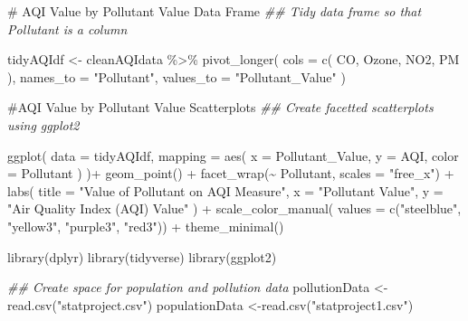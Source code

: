 \documentclass[
  letterpaper,
  DIV=11,
  numbers=noendperiod]{scrartcl}
\newenvironment{Shaded}{\begin{snugshade}}{\end{snugshade}}
\newcommand{\AttributeTok}[1]{\textcolor[rgb]{0.40,0.45,0.13}{#1}}
\newcommand{\CommentTok}[1]{\textcolor[rgb]{0.37,0.37,0.37}{#1}}
\newcommand{\DocumentationTok}[1]{\textcolor[rgb]{0.37,0.37,0.37}{\textit{#1}}}
\newcommand{\FunctionTok}[1]{\textcolor[rgb]{0.28,0.35,0.67}{#1}}
\newcommand{\NormalTok}[1]{\textcolor[rgb]{0.00,0.23,0.31}{#1}}
\newcommand{\OtherTok}[1]{\textcolor[rgb]{0.00,0.23,0.31}{#1}}
\newcommand{\SpecialCharTok}[1]{\textcolor[rgb]{0.37,0.37,0.37}{#1}}
\newcommand{\StringTok}[1]{\textcolor[rgb]{0.13,0.47,0.30}{#1}}
\begin{document}
\begin{Shaded}
\begin{Highlighting}[]
\CommentTok{\# AQI Value by Pollutant Value Data Frame}
\DocumentationTok{\#\# Tidy data frame so that Pollutant is a column}
  
\NormalTok{tidyAQIdf }\OtherTok{\textless{}{-}}\NormalTok{ cleanAQIdata }\SpecialCharTok{\%\textgreater{}\%}
  \FunctionTok{pivot\_longer}\NormalTok{(}
    \AttributeTok{cols =} \FunctionTok{c}\NormalTok{(}
\NormalTok{      CO,}
\NormalTok{      Ozone,}
\NormalTok{      NO2,}
\NormalTok{      PM}
\NormalTok{    ),}
    \AttributeTok{names\_to =} \StringTok{"Pollutant"}\NormalTok{,}
    \AttributeTok{values\_to =} \StringTok{"Pollutant\_Value"}
\NormalTok{  )}

\CommentTok{\#AQI Value by Pollutant Value Scatterplots}
\DocumentationTok{\#\# Create facetted scatterplots using ggplot2}

\FunctionTok{ggplot}\NormalTok{(}
  \AttributeTok{data =}\NormalTok{ tidyAQIdf,}
  \AttributeTok{mapping =} \FunctionTok{aes}\NormalTok{(}
    \AttributeTok{x =}\NormalTok{ Pollutant\_Value,}
    \AttributeTok{y =}\NormalTok{ AQI,}
    \AttributeTok{color =}\NormalTok{ Pollutant}
\NormalTok{    )}
\NormalTok{  )}\SpecialCharTok{+}
    \FunctionTok{geom\_point}\NormalTok{() }\SpecialCharTok{+}
    \FunctionTok{facet\_wrap}\NormalTok{(}\SpecialCharTok{\textasciitilde{}}\NormalTok{ Pollutant, }\AttributeTok{scales =} \StringTok{"free\_x"}\NormalTok{) }\SpecialCharTok{+}
    \FunctionTok{labs}\NormalTok{(}
      \AttributeTok{title =} \StringTok{"Value of Pollutant on AQI Measure"}\NormalTok{,}
      \AttributeTok{x =} \StringTok{"Pollutant Value"}\NormalTok{,}
      \AttributeTok{y =} \StringTok{"Air Quality Index (AQI) Value"}
\NormalTok{    ) }\SpecialCharTok{+}
    \FunctionTok{scale\_color\_manual}\NormalTok{(}
      \AttributeTok{values =} \FunctionTok{c}\NormalTok{(}\StringTok{"steelblue"}\NormalTok{, }\StringTok{"yellow3"}\NormalTok{, }\StringTok{"purple3"}\NormalTok{, }\StringTok{"red3"}\NormalTok{)) }\SpecialCharTok{+}
    \FunctionTok{theme\_minimal}\NormalTok{()}


\FunctionTok{library}\NormalTok{(dplyr)}
\FunctionTok{library}\NormalTok{(tidyverse)}
\FunctionTok{library}\NormalTok{(ggplot2)}


\DocumentationTok{\#\# Create space for population and pollution data}
\NormalTok{pollutionData }\OtherTok{\textless{}{-}} \FunctionTok{read.csv}\NormalTok{(}\StringTok{"statproject.csv"}\NormalTok{)}
\NormalTok{populationData }\OtherTok{\textless{}{-}}\FunctionTok{read.csv}\NormalTok{(}\StringTok{"statproject1.csv"}\NormalTok{)}


\end{Highlighting}
\end{Shaded}
\end{document}
